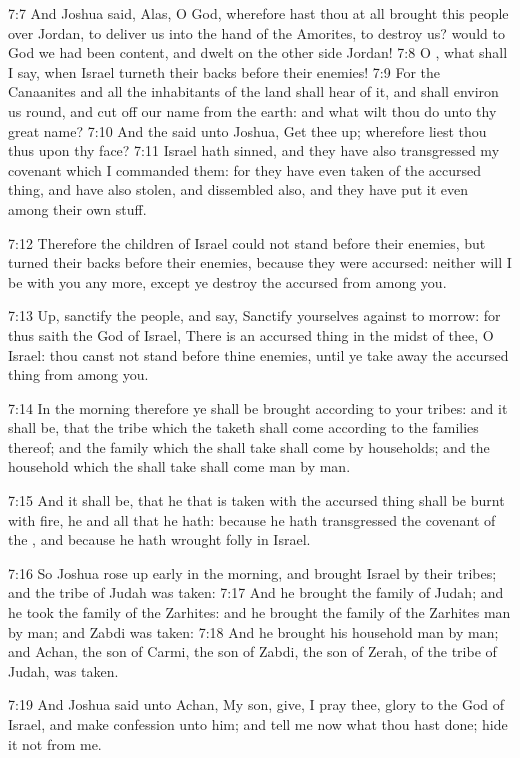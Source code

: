 7:7 And Joshua said, Alas, O \LORD God, wherefore hast thou at all brought this people over Jordan, to deliver us into the hand of the Amorites, to destroy us? would to God we had been content, and dwelt on the other side Jordan!  7:8 O \LORD, what shall I say, when Israel turneth their backs before their enemies!  7:9 For the Canaanites and all the inhabitants of the land shall hear of it, and shall environ us round, and cut off our name from the earth: and what wilt thou do unto thy great name?  7:10 And the \LORD said unto Joshua, Get thee up; wherefore liest thou thus upon thy face?  7:11 Israel hath sinned, and they have also transgressed my covenant which I commanded them: for they have even taken of the accursed thing, and have also stolen, and dissembled also, and they have put it even among their own stuff.

7:12 Therefore the children of Israel could not stand before their enemies, but turned their backs before their enemies, because they were accursed: neither will I be with you any more, except ye destroy the accursed from among you.

7:13 Up, sanctify the people, and say, Sanctify yourselves against to morrow: for thus saith the \LORD God of Israel, There is an accursed thing in the midst of thee, O Israel: thou canst not stand before thine enemies, until ye take away the accursed thing from among you.

7:14 In the morning therefore ye shall be brought according to your tribes: and it shall be, that the tribe which the \LORD taketh shall come according to the families thereof; and the family which the \LORD shall take shall come by households; and the household which the \LORD shall take shall come man by man.

7:15 And it shall be, that he that is taken with the accursed thing shall be burnt with fire, he and all that he hath: because he hath transgressed the covenant of the \LORD, and because he hath wrought folly in Israel.

7:16 So Joshua rose up early in the morning, and brought Israel by their tribes; and the tribe of Judah was taken: 7:17 And he brought the family of Judah; and he took the family of the Zarhites: and he brought the family of the Zarhites man by man; and Zabdi was taken: 7:18 And he brought his household man by man; and Achan, the son of Carmi, the son of Zabdi, the son of Zerah, of the tribe of Judah, was taken.

7:19 And Joshua said unto Achan, My son, give, I pray thee, glory to the \LORD God of Israel, and make confession unto him; and tell me now what thou hast done; hide it not from me.


